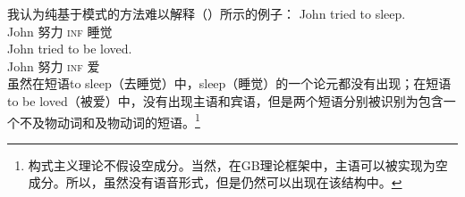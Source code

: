 \begin{exe}
\begin{xlist}[iv.]
\begin{exe}
\begin{xlist}[iv.]
我认为纯基于模式的方法难以解释（）所示的例子：
\eal
\ex 
\gll John tried to sleep.\\
     John 努力 \textsc{inf} 睡觉\\
\ex
\gll John tried to be loved.\\
     John 努力 \textsc{inf} \passive{} 爱\\
\zl
虽然在短语to sleep（去睡觉）中，sleep（睡觉）的一个论元都没有出现；在短语to be loved（被爱）中，没有出现主语和宾语，但是两个短语分别被识别为包含一个不及物动词和及物动词的短语。\footnote{%
构式主义理论不假设空成分。当然，在GB理论框架中，主语可以被实现为空成分。所以，虽然没有语音形式，但是仍然可以出现在该结构中。%
}  


\end{xlist}
\end{exe}
\end{xlist}
\end{exe}
